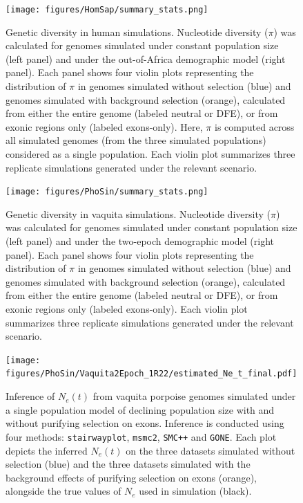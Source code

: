 \documentclass[hidelinks]{article}
\newcommand{\msmc}{\texttt{msmc2}\xspace}
\newcommand{\stairway}{\texttt{stairwayplot}\xspace}
\newcommand{\gone}{\texttt{GONE}\xspace}
\newcommand{\smcpp}{\texttt{SMC++}\xspace}
\begin{document}
\begin{figure}[h]
    \centering
    \texttt{[image: figures/HomSap/summary\_stats.png]}
    \caption{
    \label{fig:homsap-summary-stats}
    Genetic diversity in human simulations.
    Nucleotide diversity ($\pi$) was calculated for genomes simulated
    under constant population size (left panel) and under the out-of-Africa demographic model (right panel).
    Each panel shows four violin plots representing the distribution of $\pi$
    in genomes simulated without selection (blue) and genomes simulated with background selection (orange),
    calculated from either the entire genome (labeled neutral or DFE),
    or from exonic regions only (labeled exons-only).
    Here, $\pi$ is computed across all simulated genomes (from the three simulated populations)
    considered as a single population.
    Each violin plot summarizes three replicate simulations generated under the relevant scenario. 
    } 
\end{figure}
\begin{figure}[h]
    \centering
    \texttt{[image: figures/PhoSin/summary\_stats.png]}
    \caption{
    \label{fig:vaquita-summary-stats}
    Genetic diversity in vaquita simulations.
    Nucleotide diversity ($\pi$) was calculated for genomes simulated
    under constant population size (left panel) and under the two-epoch demographic model (right panel).
    Each panel shows four violin plots representing the distribution of $\pi$
    in genomes simulated without selection (blue) and genomes simulated with background selection (orange),
    calculated from either the entire genome (labeled neutral or DFE),
    or from exonic regions only (labeled exons-only).
    Each violin plot summarizes three replicate simulations generated under the relevant scenario.
     }
\end{figure}

\begin{figure}[h]
    \centering
    \texttt{[image: figures/PhoSin/Vaquita2Epoch\_1R22/estimated\_Ne\_t\_final.pdf]}
    \caption{
    \label{fig:vaquita-demography}
    Inference of $N_e(t)$ from vaquita porpoise genomes simulated under a single population
    model of declining population size with and without purifying selection on exons.
    Inference is conducted using four methods: \stairway, \msmc, \smcpp and \gone.
    Each plot depicts the inferred $N_e(t)$ on the three datasets simulated without selection (blue)
    and the three datasets simulated with the background effects of purifying selection on exons (orange),
    alongside the true values of $N_e$ used in simulation (black).
}
\end{figure}
\end{document}
